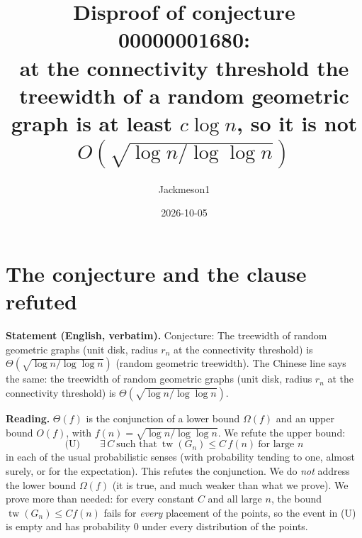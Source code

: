 \documentclass[11pt]{article}
\title{Disproof of conjecture 00000001680:\\ at the connectivity threshold the treewidth of a random geometric graph is at least $c\log n$, so it is not $O(\sqrt{\log n/\log\log n})$}
\author{Jackmeson1}
\date{2026-10-05}
\theoremstyle{definition}
\theoremstyle{remark}
\newcommand{\tw}{\operatorname{tw}}
\begin{document}
\maketitle

\section{The conjecture and the clause refuted}

\textbf{Statement (English, verbatim).} Conjecture: The treewidth of random geometric graphs
(unit disk, radius $r_n$ at the connectivity threshold) is
$\Theta(\sqrt{\log n / \log\log n})$ (random geometric treewidth). The Chinese line says the
same: the treewidth of random geometric graphs (unit disk, radius $r_n$ at the connectivity
threshold) is $\Theta(\sqrt{\log n/\log\log n})$.

\textbf{Reading.} $\Theta(f)$ is the conjunction of a lower bound $\Omega(f)$ and an upper bound
$O(f)$, with $f(n)=\sqrt{\log n/\log\log n}$. We refute the upper bound:
\[
  \text{(U)}\qquad \exists\, C\ \text{such that}\ \tw(G_n)\le C\, f(n)\ \text{for large } n
\]
in each of the usual probabilistic senses (with probability tending to one, almost surely, or
for the expectation). This refutes the conjunction. We do \emph{not} address the lower bound
$\Omega(f)$ (it is true, and much weaker than what we prove). We prove more than needed: for
every constant $C$ and all large $n$, the bound $\tw(G_n)\le C f(n)$ fails for \emph{every}
placement of the points, so the event in (U) is empty and has probability $0$ under every
distribution of the points.
\end{document}
